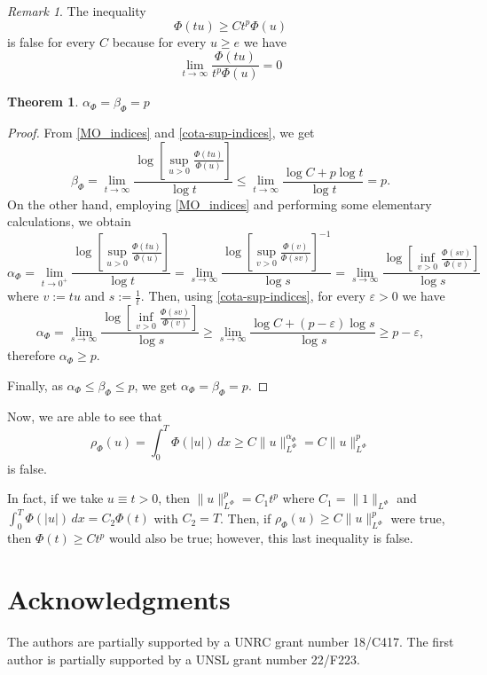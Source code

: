 \documentclass[twoside]{article}
\newtheorem{thm}{Theorem}[section]
\theoremstyle{remark}
\newtheorem{comentario}{Remark}
\newcommand{\orlnor}{\|_{L^{\Phi}}}
\renewcommand{\leq}{\leqslant}
\renewcommand{\geq}{\geqslant}
\begin{document}
\begin{comentario}
The inequality
\[
\Phi(tu)\geq Ct^p\Phi(u)
\]
is false for every $C$ because for every $u\geq e$ we have
\[
\lim\limits_{t \to \infty}\frac{\Phi(tu)}{t^p\Phi(u)}=0
\]
\end{comentario}






\begin{thm}
$\alpha_{\Phi}=\beta_{\Phi}=p$
\end{thm}

\begin{proof}
From \eqref{MO_indices} and \eqref{cota-sup-indices}, we get
\[
\beta_{\Phi}=\lim\limits_{t \to \infty} \frac{\log\left[\sup\limits_{u>0} \frac{\Phi(tu)}{\Phi(u)}\right]}{\log t}
\leq
\lim \limits_{t \to \infty} \frac{\log C+p\log t}{\log t}=p.
\]
On the other hand, employing \eqref{MO_indices} and performing some elementary calculations, we obtain
\[
\alpha_{\Phi}=
\lim\limits_{t \to 0^+} \frac{\log\left[\sup\limits_{u>0} \frac{\Phi(tu)}{\Phi(u)}\right]}{\log t}=
\lim\limits_{s \to \infty} \frac{\log\left[\sup\limits_{v>0} \frac{\Phi(v)}{\Phi(sv)}\right]^{-1}}{\log s}=
\lim\limits_{s \to \infty} \frac{\log\left[\inf\limits_{v>0} \frac{\Phi(sv)}{\Phi(v)}\right]}{\log s}
\]
where $v:=tu$ and $s:=\frac{1}{t}$.
Then, using \eqref{cota-sup-indices},  for every $\varepsilon>0$ we have
\[
\alpha_{\Phi}=
\lim\limits_{s \to \infty} \frac{\log\left[\inf\limits_{v>0} \frac{\Phi(sv)}{\Phi(v)}\right]}{\log s}\geq
\lim\limits_{s \to \infty} \frac{\log C+(p-\varepsilon)\log s}{\log s}\geq p-\varepsilon,
\]
therefore $\alpha_{\Phi}\geq p$.

Finally, as $\alpha_{\Phi}\leq \beta_{\Phi}\leq p$, we get
$\alpha_{\Phi}=\beta_{\Phi}=p$.
\end{proof}



Now, we are able to see that
\[
\rho_{\Phi}(u)=\int_0^T \Phi(|u|)\,dx\geq C\|u\orlnor^{\alpha_{\Phi}}=C\|u\orlnor^p
\]
is false.

In fact, if we take $u\equiv t>0$, then $\|u\orlnor^p=C_1t^p$ where $C_1=\|1\orlnor$ and
$\int_0^T \Phi(|u|)\,dx=C_2\Phi(t)$ with $C_2=T$.
Then, if $\rho_{\Phi}(u)\geq C\|u\orlnor^p$ were true, then $\Phi(t)\geq C t^p$ would also be true; however, this
last inequality is false.
 



\section*{Acknowledgments}
The authors are partially supported by a UNRC grant number 18/C417. The first author is  partially supported by a  UNSL grant number 22/F223. 


  
 
\end{document}
